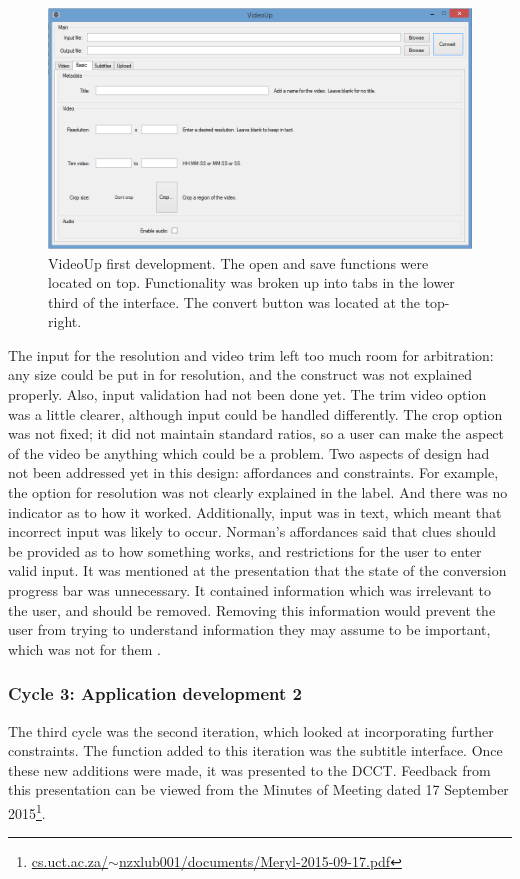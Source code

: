 \documentclass{sig-alternate-05-2015}
\begin{document}
\begin{figure} [h]
\includegraphics[scale=0.33]{dev1}
\caption{VideoUp first development. The open and save functions were located on top. Functionality was broken up into tabs in the lower third of the interface. The convert button was located at the top-right.}
\end{figure}

The input for the resolution and video trim left too much room for arbitration: any size could be put in for resolution, and the construct was not explained properly. Also, input validation had not been done yet. The trim video option was a little clearer, although input could be handled differently. The crop option was not fixed; it did not maintain standard ratios, so a user can make the aspect of the video be anything which could be a problem. Two aspects of design had not been addressed yet in this design: affordances and constraints. For example, the option for resolution was not clearly explained in the label. And there was no indicator as to how it worked. Additionally, input was in text, which meant that incorrect input was likely to occur. Norman's affordances \cite{mcgrenere2000affordances} said that clues should be provided as to how something works, and restrictions for the user to enter valid input.
It was mentioned at the presentation that the state of the conversion progress bar was unnecessary. It contained information which was irrelevant to the user, and should be removed. Removing this information would prevent the user from trying to understand information they may assume to be important, which was not for them \cite{volker2004thoughts}.

\subsubsection{Cycle 3: Application development 2}
The third cycle was the second iteration, which looked at incorporating further constraints. The function added to this iteration was the subtitle interface. Once these new additions were made, it was presented to the DCCT. Feedback from this presentation can be viewed from the Minutes of Meeting dated 17 September 2015\footnote{\href{http://people.cs.uct.ac.za/~nzxlub001/documents/Meryl-2015-09-17.pdf}{cs.uct.ac.za/$\sim$nzxlub001/documents/Meryl-2015-09-17.pdf}}.
\end{document}
